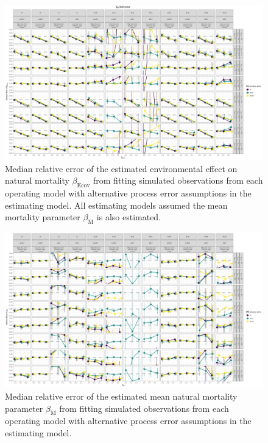 \documentclass[
  12pt,
]{article}
\begin{document}
\begin{landscape}
\begin{figure}
\caption{Median relative error of the estimated environmental effect on natural mortality $\beta_\text{Ecov}$ from fitting simulated observations from each operating model with alternative process error assumptions in the estimating model. All estimating models assumed the mean mortality parameter $\beta_\text{M}$ is also estimated.}\label{Ecov_beta_bias_M_estimated}
\begin{center}
\includegraphics[height = \textheight]{Ecov_beta_bias_all_PE_effect_M_estimated.png}
\end{center}
\end{figure}
\end{landscape}

\begin{landscape}
\begin{figure}
\caption{Median relative error of the estimated mean natural mortality parameter $\beta_\text{M}$ from fitting simulated observations from each operating model with alternative process error assumptions in the estimating model.}\label{mean_M_bias}
\begin{center}
\includegraphics[height = \textheight]{mean_M_bias_all_PE_effect.png}
\end{center}
\end{figure}
\end{landscape}
\end{document}
